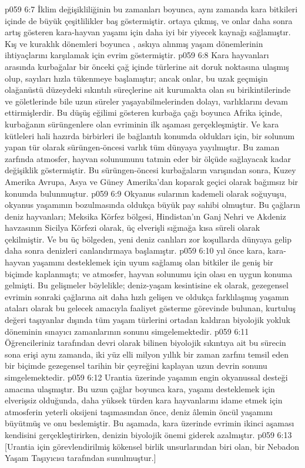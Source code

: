 \vs p059 6:7 İklim değişikliliğinin bu zamanları boyunca, aynı zamanda kara bitkileri içinde de büyük çeşitlilikler baş göstermiştir.  ortaya çıkmış, ve onlar daha sonra artış gösteren kara\hyp{}hayvan yaşamı için daha iyi bir yiyecek kaynağı sağlamıştır. Kış ve kuraklık dönemleri boyunca , askıya alınmış yaşam dönemlerinin ihtiyaçlarını karşılamak için evrim göstermiştir.
\vs p059 6:8 Kara hayvanları arasında kurbağalar bir önceki çağ içinde türlerine ait doruk noktasına ulaşmış olup, sayıları hızla tükenmeye başlamıştır; ancak onlar, bu uzak geçmişin olağanüstü düzeydeki sıkıntılı süreçlerine ait kurumakta olan su birikintilerinde ve göletlerinde bile uzun süreler yaşayabilmelerinden dolayı, varlıklarını devam ettirmişlerdir. Bu düşüş eğilimi gösteren kurbağa çağı boyunca Afrika içinde, kurbağanın sürüngenlere olan evriminin ilk aşaması gerçekleşmiştir. Ve kara kütleleri hali hazırda birbirleri ile bağlantılı konumda oldukları için, bir solunum yapan tür olarak sürüngen\hyp{}öncesi varlık tüm dünyaya yayılmıştır. Bu zaman zarfında atmosfer, hayvan solunumunu tatmin eder bir ölçüde sağlayacak kadar değişiklik göstermiştir. Bu sürüngen\hyp{}öncesi kurbağaların varışından sonra, Kuzey Amerika Avrupa, Asya ve Güney Amerika’dan koparak geçici olarak bağımsız bir konumda bulunmuştur.
\vs p059 6:9 Okyanus sularının kademeli olarak soğuyuşu, okyanus yaşamının bozulmasında oldukça büyük pay sahibi olmuştur. Bu çağların deniz hayvanları; Meksika Körfez bölgesi, Hindistan’ın Ganj Nehri ve Akdeniz havzasının Sicilya Körfezi olarak, üç elverişli sığınağa kısa süreli olarak çekilmiştir. Ve bu üç bölgeden, yeni deniz canlıları zor koşullarda dünyaya gelip daha sonra denizleri canlandırmaya başlamıştır.
\vs p059 6:10  yıl önce kara, kara\hyp{}hayvan yaşamını desteklemek için uyum sağlamış olan bitkiler ile geniş bir biçimde kaplanmıştı; ve atmosfer, hayvan solunumu için olası en uygun konuma gelmişti. Bu gelişmeler böylelikle; deniz\hyp{}yaşam kesintisine ek olarak, gezegensel evrimin sonraki çağlarına ait daha hızlı gelişen ve oldukça farklılaşmış yaşamın ataları olarak bu gelecek amacıyla faaliyet gösterme görevinde bulunan, kurtuluş değeri taşıyanlar dışında tüm yaşam türlerini ortadan kaldıran biyolojik yokluk döneminin sınayıcı zamanlarının sonunu simgelemektedir.
\vs p059 6:11 Öğrencileriniz tarafından  devri olarak bilinen biyolojik sıkıntıya ait bu sürecin sona erişi aynı zamanda, iki yüz elli milyon yıllık bir zaman zarfını temsil eden bir biçimde gezegensel tarihin bir çeyreğini kaplayan uzun  devrin sonunu simgelemektedir.
\vs p059 6:12 Urantia üzerinde yaşamın engin okyanussal desteği amacına ulaşmıştır. Bu uzun çağlar boyunca kara, yaşamı desteklemek için elverişsiz olduğunda, daha yüksek türden kara hayvanlarını idame etmek için atmosferin yeterli oksijeni taşımasından önce, deniz âlemin öncül yaşamını büyütmüş ve onu beslemiştir. Bu aşamada, kara üzerinde evrimin ikinci aşaması kendisini gerçekleştirirken, denizin biyolojik önemi giderek azalmıştır.
\vs p059 6:13 [Urantia için görevlendirilmiş kökensel birlik unsurlarından biri olan, bir Nebadon Yaşam Taşıyıcısı tarafından sunulmuştur.]
